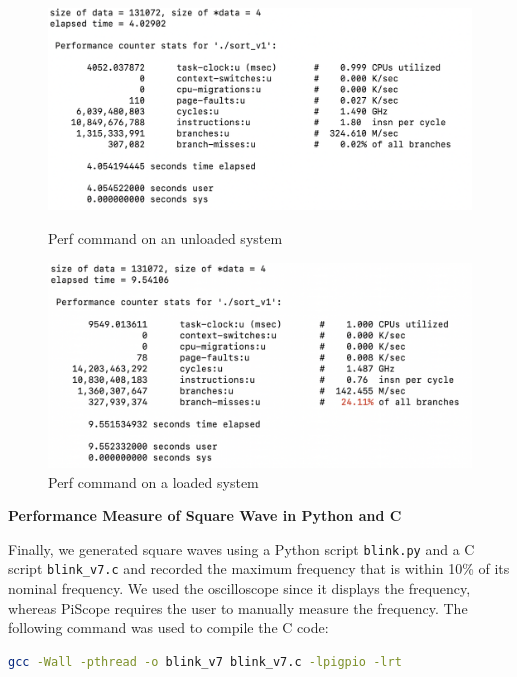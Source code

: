 \documentclass[a4paper,10pt]{article}
\newcommand{\code}[1]{\colorbox{light-gray}{\texttt{#1}}}
\begin{document}
\begin{figure}[H]
\centering
\begin{minipage}{0.5\textwidth}
  \centering
  \includegraphics[width=0.9\linewidth]{Images/perf unloaded.png}
  \caption{Perf command on an unloaded system}
  \label{Perf command unloaded}
\end{minipage}%
\begin{minipage}{0.5\textwidth}
  \centering
  \includegraphics[width=0.9\linewidth]{Images/perf loaded.png}
  \caption{Perf command on a loaded system}
  \label{Perf command loaded}
\end{minipage}
\end{figure}

\textbf{Performance Measure of Square Wave in Python and C}

Finally, we generated square waves using a Python script \code{blink.py} and a C script \code{blink\_v7.c} and recorded the maximum frequency that is within 10\% of its nominal frequency. We used the oscilloscope since it displays the frequency, whereas PiScope requires the user to manually measure the frequency. The following command was used to compile the C code:
\begin{center}
\begin{lstlisting}[language=bash, label=code:code6] 
gcc -Wall -pthread -o blink_v7 blink_v7.c -lpigpio -lrt
\end{lstlisting}
\end{center}\vspace{-1em}
\end{document}

